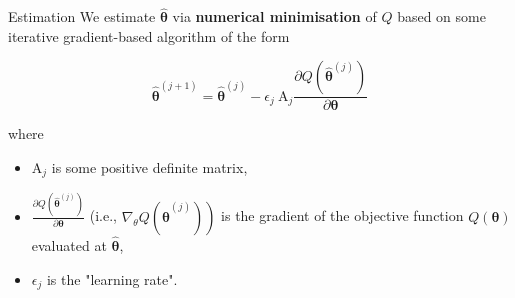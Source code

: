 \documentclass{beamer}
\begin{document}
\begin{frame}{Estimation}
We estimate $\hat{\boldsymbol{\theta}}$ via \textbf{numerical minimisation} of $Q$ based on some iterative gradient-based algorithm of the form

$$
\hat{\boldsymbol{\theta}}^{(j+1)}=\hat{\boldsymbol{\theta}}^{(j)}-\epsilon_{j} \mathrm{~A}_{j} \frac{\partial Q\left(\hat{\boldsymbol{\theta}}^{(j)}\right)}{\partial \boldsymbol{\theta}}
$$

where
\begin{itemize}
\item $\mathrm{A}_{j}$ is some positive definite matrix,

\item $\frac{\partial Q\left(\hat{\boldsymbol{\theta}}^{(j)}\right)}{\partial \boldsymbol{\theta}}$ (i.e., $\left.\nabla_{\theta} Q\left(\hat{\boldsymbol{\theta}}^{(j)}\right)\right)$ is the gradient of the objective function $Q(\boldsymbol{\theta})$ evaluated at $\hat{\boldsymbol{\theta}}$,

\item $\epsilon_{j}$ is the "learning rate". 
\end{itemize}
\end{frame}
\end{document}
